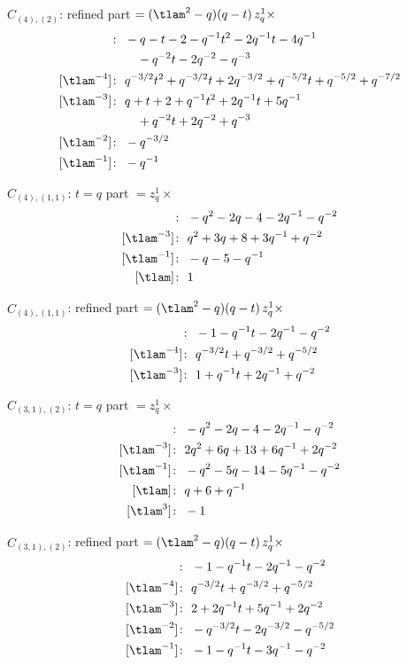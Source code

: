 $\hat C_{(4),(2)}$: refined part $= (\tlam^2 - q)(q - t)\, z_q^{1} \times$
\begin{align*}
[\tlam^{-5}]\colon\ & -q -t -2 -q^{-1} t^{2} -2 q^{-1} t -4 q^{-1} \\
& \quad -q^{-2} t -2 q^{-2} -q^{-3} \\
[\tlam^{-4}]\colon\ & q^{-3/2} t^{2} +q^{-3/2} t +2 q^{-3/2} +q^{-5/2} t +q^{-5/2} +q^{-7/2} \\
[\tlam^{-3}]\colon\ & q +t +2 +q^{-1} t^{2} +2 q^{-1} t +5 q^{-1} \\
& \quad +q^{-2} t +2 q^{-2} +q^{-3} \\
[\tlam^{-2}]\colon\ & -q^{-3/2} \\
[\tlam^{-1}]\colon\ & -q^{-1}
\end{align*}

$\hat C_{(4),(1,1)}$: $t = q$ part $= z_q^{1} \times$
\begin{align*}
[\tlam^{-5}]\colon\ & -q^{2} -2 q -4 -2 q^{-1} -q^{-2} \\
[\tlam^{-3}]\colon\ & q^{2} +3 q +8 +3 q^{-1} +q^{-2} \\
[\tlam^{-1}]\colon\ & -q -5 -q^{-1} \\
[\tlam]\colon\ & 1
\end{align*}

$\hat C_{(4),(1,1)}$: refined part $= (\tlam^2 - q)(q - t)\, z_q^{1} \times$
\begin{align*}
[\tlam^{-5}]\colon\ & -1 -q^{-1} t -2 q^{-1} -q^{-2} \\
[\tlam^{-4}]\colon\ & q^{-3/2} t +q^{-3/2} +q^{-5/2} \\
[\tlam^{-3}]\colon\ & 1 +q^{-1} t +2 q^{-1} +q^{-2}
\end{align*}

$\hat C_{(3,1),(2)}$: $t = q$ part $= z_q^{1} \times$
\begin{align*}
[\tlam^{-5}]\colon\ & -q^{2} -2 q -4 -2 q^{-1} -q^{-2} \\
[\tlam^{-3}]\colon\ & 2 q^{2} +6 q +13 +6 q^{-1} +2 q^{-2} \\
[\tlam^{-1}]\colon\ & -q^{2} -5 q -14 -5 q^{-1} -q^{-2} \\
[\tlam]\colon\ & q +6 +q^{-1} \\
[\tlam^{3}]\colon\ & -1
\end{align*}

$\hat C_{(3,1),(2)}$: refined part $= (\tlam^2 - q)(q - t)\, z_q^{1} \times$
\begin{align*}
[\tlam^{-5}]\colon\ & -1 -q^{-1} t -2 q^{-1} -q^{-2} \\
[\tlam^{-4}]\colon\ & q^{-3/2} t +q^{-3/2} +q^{-5/2} \\
[\tlam^{-3}]\colon\ & 2 +2 q^{-1} t +5 q^{-1} +2 q^{-2} \\
[\tlam^{-2}]\colon\ & -q^{-3/2} t -2 q^{-3/2} -q^{-5/2} \\
[\tlam^{-1}]\colon\ & -1 -q^{-1} t -3 q^{-1} -q^{-2}
\end{align*}


